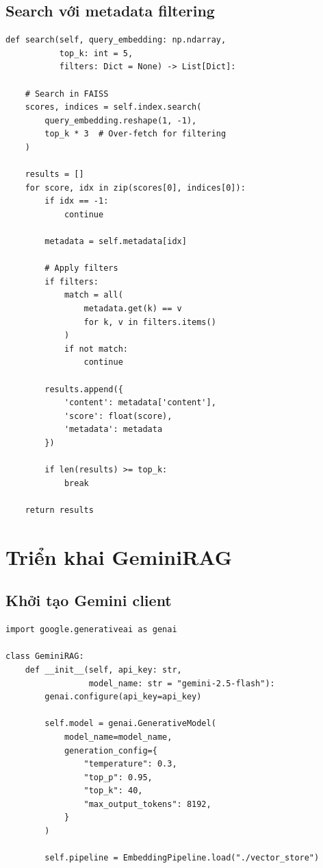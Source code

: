 \documentclass[../DoAn.tex]{subfiles}
\begin{document}
\subsection{Search với metadata filtering}
\begin{verbatim}
def search(self, query_embedding: np.ndarray, 
           top_k: int = 5, 
           filters: Dict = None) -> List[Dict]:
    
    # Search in FAISS
    scores, indices = self.index.search(
        query_embedding.reshape(1, -1), 
        top_k * 3  # Over-fetch for filtering
    )
    
    results = []
    for score, idx in zip(scores[0], indices[0]):
        if idx == -1:
            continue
            
        metadata = self.metadata[idx]
        
        # Apply filters
        if filters:
            match = all(
                metadata.get(k) == v 
                for k, v in filters.items()
            )
            if not match:
                continue
        
        results.append({
            'content': metadata['content'],
            'score': float(score),
            'metadata': metadata
        })
        
        if len(results) >= top_k:
            break
    
    return results
\end{verbatim}

\section{Triển khai GeminiRAG}

\subsection{Khởi tạo Gemini client}
\begin{verbatim}
import google.generativeai as genai

class GeminiRAG:
    def __init__(self, api_key: str, 
                 model_name: str = "gemini-2.5-flash"):
        genai.configure(api_key=api_key)
        
        self.model = genai.GenerativeModel(
            model_name=model_name,
            generation_config={
                "temperature": 0.3,
                "top_p": 0.95,
                "top_k": 40,
                "max_output_tokens": 8192,
            }
        )
        
        self.pipeline = EmbeddingPipeline.load("./vector_store")
\end{verbatim}
\end{document}
